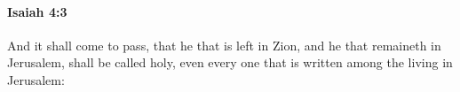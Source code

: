 
		\paragraph{Isaiah 4:3} %
			\label{ISAIAH-4-3}

			And it shall come to pass, that he that is left in Zion, and he that remaineth in Jerusalem, shall be called holy, even every one that is written among the living in Jerusalem:


